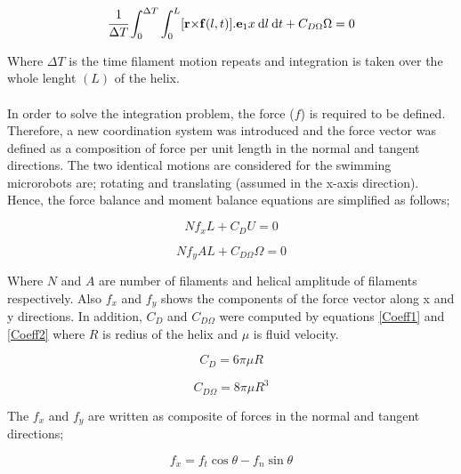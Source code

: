 \documentclass[12pt,a4paper,titlepage]{report}
\begin{document}
\begin{equation}
  \cfrac {1} {\Delta T}  \int_0^{\Delta T} \int_0^L [\bold r \bold \times \bold f(l,t)] . \bold e_1x \: \mathrm{d}l \:\mathrm{d}t + C_{D\Omega}\Omega= 0
\label{torque_1}
\end{equation}

Where $\Delta T$ is the time filament motion repeats and integration is taken over the whole lenght $(L)$ of the
helix. 

\paragraph{}
In order to solve the integration problem, the force ($f$) is required to be defined. Therefore, a new
coordination system was introduced and the force vector was defined as a composition of force per unit length
in the normal and tangent directions. The two identical motions are considered for the swimming microrobots
are; rotating and translating (assumed in the x-axis direction). Hence, the force balance and moment balance 
equations are simplified as follows; 


\begin{equation}
Nf_xL  + C_DU  = 0
\label{simple_thrust}
\end{equation}



\begin{equation}
 Nf_yAL + C_{D\Omega}\Omega= 0
\label{simple_torque}
\end{equation}

Where $N$ and $A$ are number of filaments and helical amplitude of filaments respectively. Also $f_x$ and 
$f_y$ shows the components of the force vector along x and y directions. In addition, $C_D$ and $C_{D\Omega}$
were computed by equations \ref{Coeff1} and \ref{Coeff2} where $R$ is redius of the helix and $\mu$ is fluid velocity.


\begin{equation}
 C_D  = 6 \pi \mu R
\label{Coeff1}
\end{equation}



\begin{equation}
 C_{D\Omega}= 8 \pi \mu R^3
\label{Coeff2}
\end{equation}

The $f_x$ and $f_y$ are written as composite of forces in the normal and tangent directions;

\begin{equation}
 f_x  = f_t\cos \theta - f_n\sin \theta
\label{normal}
\end{equation}
\end{document}
